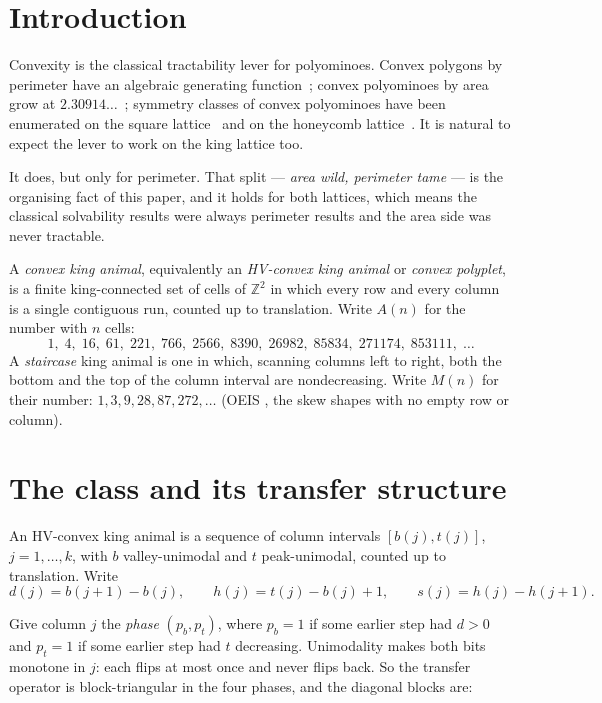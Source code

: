 \documentclass[11pt]{article}
\newcommand{\Z}{\mathbb{Z}}
\begin{document}
\tableofcontents

\section{Introduction}

Convexity is the classical tractability lever for polyominoes. Convex polygons
by perimeter have an algebraic generating
function~\cite{delestViennot1984}; convex polyominoes by area grow at
$2.30914\dots$~\cite{bender1974}; symmetry classes of convex polyominoes have
been enumerated on the square lattice~\cite{lrr1998} and on the honeycomb
lattice~\cite{gblRoux2004}. It is natural to expect the lever to work on the
king lattice too.

It does, but only for perimeter. That split --- \emph{area wild, perimeter tame}
--- is the organising fact of this paper, and it holds for both lattices, which means the classical solvability results were always
perimeter results and the area side was never tractable.

\begin{definition}
A \emph{convex king animal}, equivalently an \emph{HV-convex king animal} or
\emph{convex polyplet}, is a finite king-connected set of cells of $\Z^2$ in
which every row and every column is a single contiguous run, counted up to
translation. Write $A(n)$ for the number with $n$ cells:
\[
  1,\; 4,\; 16,\; 61,\; 221,\; 766,\; 2566,\; 8390,\; 26982,\; 85834,\;
  271174,\; 853111,\; \dots
\]
A \emph{staircase} king animal is one in which, scanning columns left to right,
both the bottom and the top of the column interval are nondecreasing. Write
$M(n)$ for their number: $1, 3, 9, 28, 87, 272, \dots$ (OEIS , the skew shapes with no empty row or column).
\end{definition}

\section{The class and its transfer structure}
\label{sec:structure}

An HV-convex king animal is a sequence of column intervals $[b(j), t(j)]$,
$j = 1,\dots,k$, with $b$ valley-unimodal and $t$ peak-unimodal, counted up to
translation. Write
\[
  d(j) = b(j{+}1) - b(j), \qquad h(j) = t(j) - b(j) + 1, \qquad
  s(j) = h(j) - h(j{+}1).
\]

Give column $j$ the \emph{phase} $(p_b, p_t)$, where $p_b = 1$ if some earlier
step had $d > 0$ and $p_t = 1$ if some earlier step had $t$ decreasing.
Unimodality makes both bits monotone in $j$: each flips at most once and never
flips back. So the transfer operator is block-triangular in the four phases, and
the diagonal blocks are:
\end{document}
